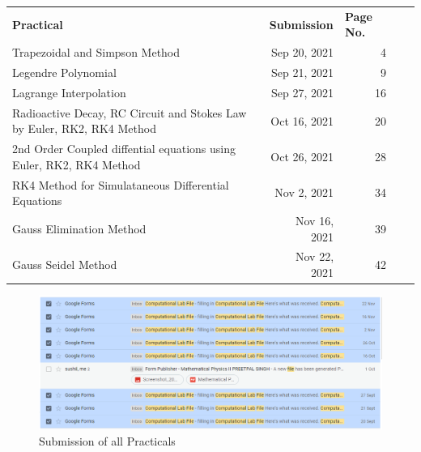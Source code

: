 \documentclass{article}
\begin{document}
\tableofcontents
\begin{table}[]
\begin{tabular}{lrrll}
\textbf{Practical}                                                              & \multicolumn{1}{l}{\textbf{Submission}} & \multicolumn{1}{l}{\textbf{Page No.}} &  &  \\
Trapezoidal and Simpson Method                                         & Sep 20, 2021                           & 4                            &  &  \\
Legendre Polynomial                                                    & Sep 21, 2021                           & 9                            &  &  \\
Lagrange Interpolation                                                 & Sep 27, 2021                           & 16                           &  &  \\
Radioactive Decay, RC Circuit and Stokes Law by Euler, RK2, RK4 Method & Oct 16, 2021                           & 20                           &  &  \\
2nd Order Coupled diffential equations using Euler, RK2, RK4 Method    & Oct 26, 2021                           & 28                           &  &  \\
RK4 Method for Simulataneous Differential Equations                    & Nov 2, 2021                            & 34                           &  &  \\
Gauss Elimination Method                                               & Nov 16, 2021                           & 39                           &  &  \\
Gauss Seidel Method                                                    & Nov 22, 2021                           & 42                           &  & 
\end{tabular}
\end{table}
\clearpage
\begin{figure}[h]
    \centering
    \includegraphics[width=15cm,height=10cm \textwidth]{Capture.PNG}
\caption{Submission of all Practicals}
\end{figure}
\end{document}

